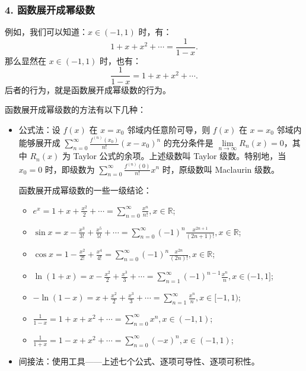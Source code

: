 \documentclass[b5paper]{ctexart}
\newcommand{\R}{\mathbb{R}}
\newcommand{\jst}{\sum \limits_{n = 1}^{\infty}}
\newcommand{\mjst}{\sum \limits_{n = 0}^{\infty}}
\newcommand \jx[3]{\lim\limits_{#1 \to #2} #3}
\begin{document}
	\subsubsection*{4. 函数展开成幂级数}
	
	例如，我们可以知道：$x \in (-1, 1)$ 时，有：
	\begin{equation*}
		1 + x + x^2 + \cdots = \frac{1}{1 - x}.
	\end{equation*}
	那么显然在 $x \in (-1, 1)$ 时，也有：
	\begin{equation*}
		\frac{1}{1 - x} = 1 + x + x^2 + \cdots.
	\end{equation*}
	后者的行为，就是函数展开成幂级数的行为。
	
	函数展开成幂级数的方法有以下几种：
	\begin{itemize}
		\item 公式法：设 $f(x)$ 在 $x = x_0$ 邻域内任意阶可导，则 $f(x)$ 在 $x = x_0$ 邻域内能够展开成 $\mjst \frac{f^{(n)}(x_0)}{n!}(x - x_0)^n$ 的充分条件是 $\jx{n}{\infty}{R_n(x)} = 0$，其中 $R_n(x)$ 为 Taylor 公式的余项。上述级数叫 Taylor 级数。特别地，当 $x_0 = 0$ 时，即级数为 $\mjst \frac{f^{(n)}(0)}{n!} x^n$ 时，原级数叫 Maclaurin 级数。
		
		函数展开成幂级数的一些一级结论：
		\begin{itemize}
			\item $e^x = 1 + x + \frac{x^2}{2} + \cdots = \mjst \frac{x^n}{n!}, x \in \R$;
			
			\item $\sin x = x - \frac{x^3}{3!} + \frac{x^5}{5!} + \cdots = \mjst (-1)^{n} \frac{x^{2n + 1}}{(2n + 1)!}, x \in \R$;
			
			\item $\cos x = 1 - \frac{x^2}{2!} + \frac{x^4}{4!} = \mjst (-1)^n \frac{x^{2n}}{(2n)!}, x \in \R$;
			
			\item $\ln (1 + x) = x - \frac{x^2}{2} + \frac{x^3}{3} + \cdots = \jst (-1)^{n - 1} \frac{x^{n}}{n}, x \in (-1, 1]$;
			
			\item $- \ln (1 - x) = x + \frac{x^2}{2} + \frac{x^3}{3} + \cdots = \jst \frac{x^{n}}{n}, x \in [-1, 1)$;
			
			\item $\frac{1}{1 - x} = 1 + x + x^2 + \cdots = \mjst x^n, x \in (-1, 1)$;
			
			\item $\frac{1}{1 + x} = 1 - x + x^2 + \cdots = \mjst (-x)^n, x \in (-1, 1)$;
		\end{itemize}
		
		
		\item 间接法：使用工具——上述七个公式、逐项可导性、逐项可积性。
	\end{itemize}
	
\end{document}
